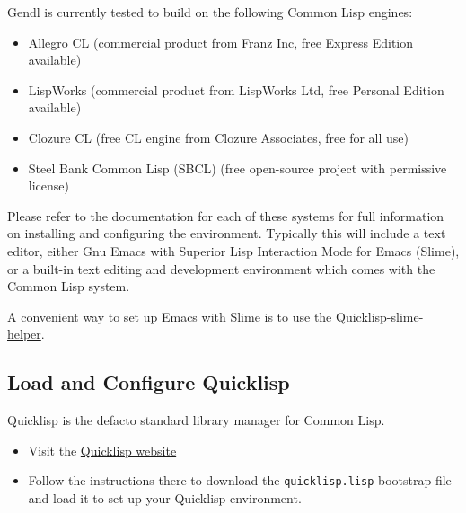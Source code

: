 \documentclass [11pt]{book}
\begin{document}
\label{subsec:installandconfigureyourcommonlispenvironment}

Gendl is currently tested to build on the following Common Lisp engines:

\begin{itemize}

\item Allegro CL (commercial product from Franz Inc, free Express Edition available)

\item LispWorks (commercial product from LispWorks Ltd, free Personal Edition available)

\item Clozure CL (free CL engine from Clozure Associates, free for all use)

\item Steel Bank Common Lisp (SBCL) (free open-source project with permissive license)

\end{itemize}

Please refer to the documentation for each of these systems
for full information on installing and configuring the
environment. Typically this will include a text editor, either Gnu
Emacs with Superior Lisp Interaction Mode for Emacs (Slime), or a
built-in text editing and development environment which comes with the
Common Lisp system.

A convenient way to set up Emacs with Slime is to use the \href{http://github.com/quicklisp/quicklisp-slime-helper}{Quicklisp-slime-helper}.

\subsection{Load and Configure Quicklisp}

\label{subsec:loadandconfigurequicklisp}

Quicklisp is the defacto standard library manager for Common
Lisp.

\begin{itemize}

\item Visit the \href{http://quicklisp.org}{Quicklisp website}

\item Follow the instructions there to download the \texttt{quicklisp.lisp} bootstrap file and load it to set up your Quicklisp environment.

\end{itemize}
\end{document}
